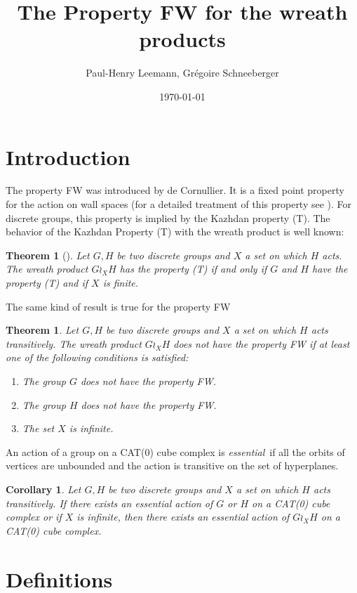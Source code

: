 \documentclass[a4paper]{article}
\title{The Property FW for the wreath products}
\author{Paul-Henry Leemann, Grégoire Schneeberger}
\date{\today \quad \currenttime}
\newtheorem{cor}[lem]{Corollary}
\newtheorem{thm}[lem]{Theorem}
\theoremstyle{remark}%
\begin{document}
\maketitle

\section{Introduction}
%
The property FW was introduced by de Cornullier. It is a fixed point property for the action on wall spaces (for a detailed treatment of this property see \cite{Cornulier2013}). For discrete groups, this property is implied by the Kazhdan property (T). The behavior of the Kazhdan Property (T) with the wreath product is well known: 
\begin{thm}[\cite{Cherix2004,Neuhauser2005a}]
Let $G,H$ be two discrete groups and $X$ a set on which $H$ acts. The wreath product $G \wr_X H$ has the property (T) if and only if $G$ and $H$ have the property (T) and if $X$ is finite.
\end{thm}
%
%
The same kind of result is true for the property FW
\begin{thm}
Let $G,H$ be two discrete groups and $X$ a set on which $H$ acts transitively. The wreath product $G \wr_X H$ does not have the property FW if at least one of the following conditions is satisfied: 
\begin{enumerate}
\item The group $G$ does not have the property FW.
\item The group $H$ does not have the property FW.
\item The set $X$ is infinite.
\end{enumerate}
\end{thm}
%
%
An action of a group on a CAT(0) cube complex is \emph{essential} if all the orbits of vertices are unbounded and the action is transitive on the set of hyperplanes.
\begin{cor}
Let $G,H$ be two discrete groups and $X$ a set on which $H$ acts transitively. If there exists an essential action of $G$ or $H$ on a CAT(0) cube complex  or if $X$ is infinite, then there exists an essential action of $G \wr_X H$ on a CAT(0) cube complex. 
\end{cor}
%
%

%
%
\section{Definitions}
\end{document}
